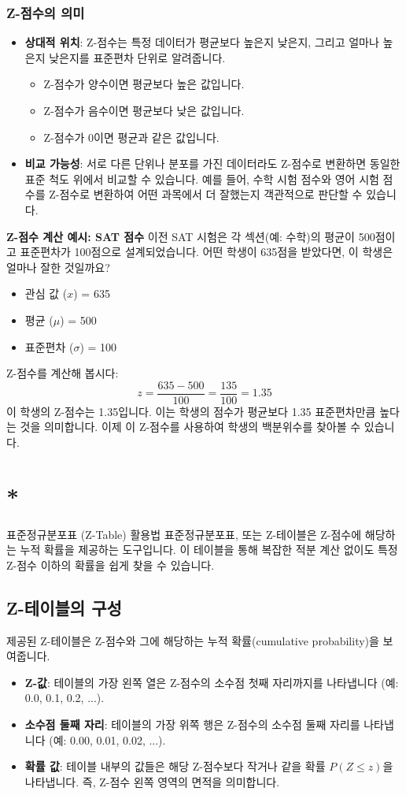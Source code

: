 \documentclass[11pt,a4paper]{article}
\theoremstyle{definition}
\newcommand{\newsection}[1]{\newpage\section{#1}}
\begin{document}
\subsubsection*{Z-점수의 의미}
\begin{itemize}
    \item \textbf{상대적 위치}: Z-점수는 특정 데이터가 평균보다 높은지 낮은지, 그리고 얼마나 높은지 낮은지를 표준편차 단위로 알려줍니다.
        \begin{itemize}
            \item Z-점수가 양수이면 평균보다 높은 값입니다.
            \item Z-점수가 음수이면 평균보다 낮은 값입니다.
            \item Z-점수가 0이면 평균과 같은 값입니다.
        \end{itemize}
    \item \textbf{비교 가능성}: 서로 다른 단위나 분포를 가진 데이터라도 Z-점수로 변환하면 동일한 표준 척도 위에서 비교할 수 있습니다. 예를 들어, 수학 시험 점수와 영어 시험 점수를 Z-점수로 변환하여 어떤 과목에서 더 잘했는지 객관적으로 판단할 수 있습니다.
\end{itemize}

\begin{examplebox}
\textbf{Z-점수 계산 예시: SAT 점수}
이전 SAT 시험은 각 섹션(예: 수학)의 평균이 500점이고 표준편차가 100점으로 설계되었습니다. 어떤 학생이 635점을 받았다면, 이 학생은 얼마나 잘한 것일까요?

\begin{itemize}
    \item 관심 값 ($x$) = 635
    \item 평균 ($\mu$) = 500
    \item 표준편차 ($\sigma$) = 100
\end{itemize}
Z-점수를 계산해 봅시다:
\[ z = \frac{635 - 500}{100} = \frac{135}{100} = 1.35 \]
이 학생의 Z-점수는 1.35입니다. 이는 학생의 점수가 평균보다 1.35 표준편차만큼 높다는 것을 의미합니다. 이제 이 Z-점수를 사용하여 학생의 백분위수를 찾아볼 수 있습니다.
\end{examplebox}

\newsection*{표준정규분포표 (Z-Table) 활용법}
표준정규분포표, 또는 Z-테이블은 Z-점수에 해당하는 누적 확률을 제공하는 도구입니다. 이 테이블을 통해 복잡한 적분 계산 없이도 특정 Z-점수 이하의 확률을 쉽게 찾을 수 있습니다.

\subsection{Z-테이블의 구성}
제공된 Z-테이블은 Z-점수와 그에 해당하는 누적 확률(cumulative probability)을 보여줍니다.
\begin{itemize}
    \item \textbf{Z-값}: 테이블의 가장 왼쪽 열은 Z-점수의 소수점 첫째 자리까지를 나타냅니다 (예: 0.0, 0.1, 0.2, ...).
    \item \textbf{소수점 둘째 자리}: 테이블의 가장 위쪽 행은 Z-점수의 소수점 둘째 자리를 나타냅니다 (예: 0.00, 0.01, 0.02, ...).
    \item \textbf{확률 값}: 테이블 내부의 값들은 해당 Z-점수보다 작거나 같을 확률 $P(Z \le z)$을 나타냅니다. 즉, Z-점수 왼쪽 영역의 면적을 의미합니다.
\end{itemize}
\end{document}
